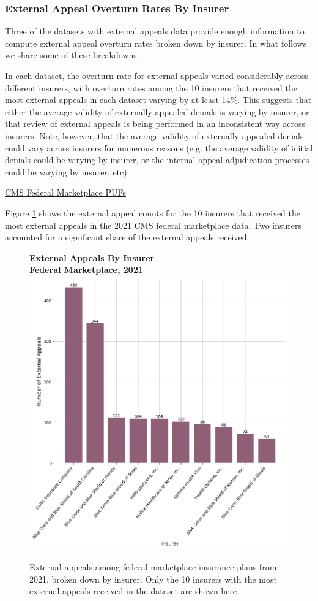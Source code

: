 \documentclass[12pt, a4paper,twoside,parskip=full]{report}
\theoremstyle{plain} %
\theoremstyle{definition} %
\theoremstyle{remark} %
\numberwithin{equation}{chapter}
\begin{document}
				
		
		\subsubsection{External Appeal Overturn Rates By Insurer}
		
		Three of the datasets with external appeals data provide enough information to compute external appeal overturn rates broken down by insurer. In what follows we share some of these breakdowns.
		
		In each dataset, the overturn rate for external appeals varied considerably across different insurers, with overturn rates among the 10 insurers that received the most external appeals in each dataset varying by at least 14\%. This suggests that either the average validity of externally appealed denials is varying by insurer, or that review of external appeals is being performed in an inconsistent way across insurers. Note, however, that the average validity of externally appealed denials could vary across insurers for numerous reasons (e.g. the average validity of initial denials could be varying by insurer, or the internal appeal adjudication processes could be varying by insurer, etc).
		
		\underline{CMS Federal Marketplace PUFs}
		
		Figure \ref{federalexternalbyinsurer} shows the external appeal counts for the 10 insurers that received the most external appeals in the 2021 CMS federal marketplace data. Two insurers accounted for a significant share of the external appeals received.
		
		
		\begin{figure}[h!]
			\centering
			\textbf{External Appeals By Insurer}\\
			\textbf{Federal Marketplace, 2021}\\
			\includegraphics[width=.8\textwidth]{images/cms_puf/external_appeals_top_insurers.png}
			\caption{External appeals among federal marketplace insurance plans from 2021, broken down by insurer. Only the 10 insurers with the most external appeals received in the dataset are shown here.}
			\label{federalexternalbyinsurer}
		\end{figure}
		
\end{document}
